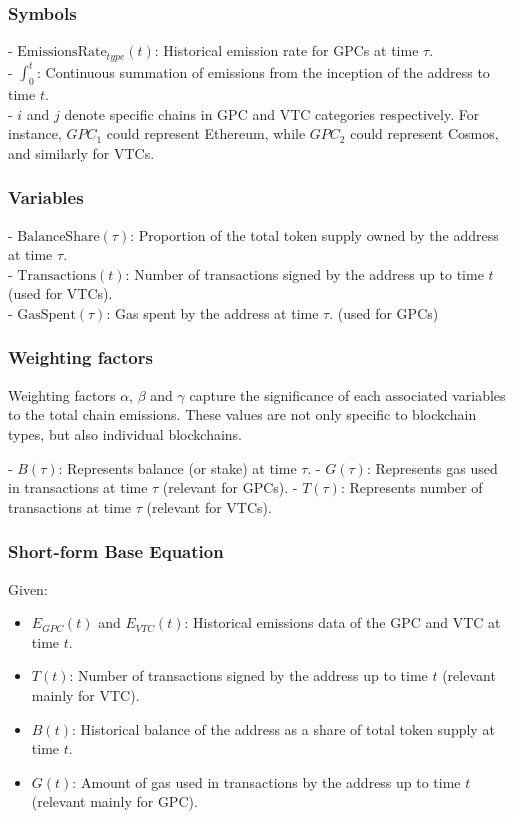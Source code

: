 \documentclass[12pt,a4paper]{report}
\begin{document}
\subsubsection*{Symbols}
- \(\text{EmissionsRate}_{type}(t)\): Historical emission rate for GPCs at time \(\tau\). \\
- \( \int_{0}^{t} \): Continuous summation of emissions from the inception of the address to time \(t\). \\
- \( i \) and \( j \) denote specific chains in GPC and VTC categories respectively. For instance, \( GPC_1 \) could represent Ethereum, while \( GPC_2 \) could represent Cosmos, and similarly for VTCs.

\subsubsection*{Variables}
- \(\text{BalanceShare}(\tau)\): Proportion of the total token supply owned by the address at time \(\tau\). \\
- \(\text{Transactions}(t)\): Number of transactions signed by the address up to time $t$ (used for VTCs). \\ 
- \(\text{GasSpent}(\tau)\): Gas spent by the address at time \(\tau\). (used for GPCs)
\subsubsection*{Weighting factors}

Weighting factors $\alpha$, $\beta$ and $\gamma$ capture the significance of each associated variables to the total
chain emissions. These values are not only specific to blockchain types, but also individual blockchains. \newline

- \( B(\tau) \): Represents balance (or stake) at time \( \tau \). \newline
- \( G(\tau) \): Represents gas used in transactions at time \( \tau \) (relevant for GPCs). \newline
- \( T(\tau) \): Represents number of transactions at time \( \tau \) (relevant for VTCs). \newline

\subsubsection{Short-form Base Equation}
Given:
\begin{itemize}
    \item $E_{GPC}(t)$ and $E_{VTC}(t)$: Historical emissions data of the GPC and VTC at time $t$.
    \item $T(t)$: Number of transactions signed by the address up to time $t$ (relevant mainly for VTC).
    \item $B(t)$: Historical balance of the address as a share of total token supply at time $t$.
    \item $G(t)$: Amount of gas used in transactions by the address up to time $t$ (relevant mainly for GPC).
\end{itemize}
\end{document}
